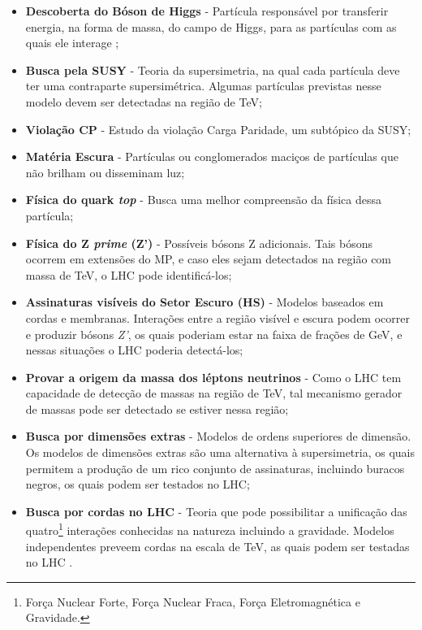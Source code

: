 \begin{itemize}
   \item \textbf{Descoberta do Bóson de Higgs} - Partícula responsável por transferir energia, na forma de massa, do campo de Higgs, para as partículas com as quais ele interage  \cite{moreira2009};
   \item \textbf{Busca pela SUSY} - Teoria da supersimetria, na qual cada partícula deve ter uma contraparte supersimétrica. Algumas partículas previstas nesse modelo devem ser detectadas na região de TeV;
   \item \textbf{Violação CP} - Estudo da violação Carga Paridade, um subtópico da SUSY;
   \item \textbf{Matéria Escura} - Partículas ou conglomerados maciços de partículas que não brilham ou disseminam luz;
   \item \textbf{Física do quark \textit{top}} - Busca uma melhor compreensão da física dessa partícula;
   \item \textbf{Física do Z \textit{prime} (Z')} - Possíveis bósons Z adicionais. Tais bósons ocorrem em extensões do MP, e caso eles sejam detectados na região com massa de TeV, o LHC pode identificá-los;
   \item \textbf{Assinaturas visíveis do Setor Escuro (HS)} - Modelos baseados em cordas e membranas. Interações entre a região visível e escura podem ocorrer e produzir bósons \textit{Z'}, os quais poderiam estar na faixa de frações de GeV, e nessas situações o LHC poderia detectá-los;
   \item \textbf{Provar a origem da massa dos léptons neutrinos} - Como o LHC tem capacidade de detecção de massas na região de TeV, tal mecanismo gerador de massas pode ser detectado se estiver nessa região;
   \item \textbf{Busca por dimensões extras} - Modelos de ordens superiores de dimensão. Os modelos de dimensões extras são uma alternativa à supersimetria, os quais permitem a produção de um rico conjunto de assinaturas, incluindo buracos negros, os quais podem ser testados no LHC;
   \item \textbf{Busca por cordas no LHC} - Teoria que pode possibilitar a unificação das quatro\footnote{Força Nuclear Forte, Força Nuclear Fraca, Força Eletromagnética e Gravidade.} interações conhecidas na natureza incluindo a gravidade. Modelos independentes preveem cordas na escala de TeV, as quais podem ser testadas no LHC .
\end{itemize}

